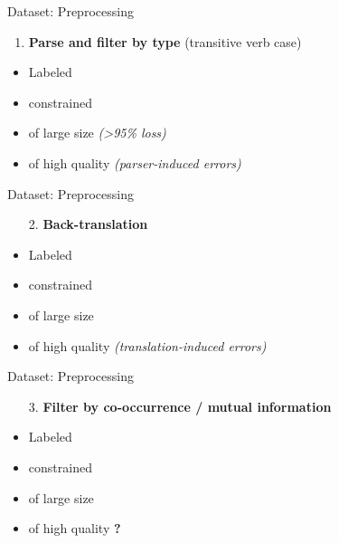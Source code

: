 \documentclass{beamer}
\newcommand{\xmark}{\ding{55}}
\begin{document}
\begin{frame}{Dataset: Preprocessing}

	\begin{enumerate}
	\item \textbf{Parse and filter by type} (transitive verb case)
	\end{enumerate}

	\begin{itemize}
	\item Labeled \textcolor{Yes}{\checkmark}
	\item constrained \textcolor{Yes}{\checkmark}
	\item of large size \textcolor{No}{\xmark} 
	\footnotesize\textit{(>95\% loss)} 
	\normalsize
	\item of high quality \textcolor{No}{\xmark}
	\footnotesize\textit{(parser-induced errors)} 
	\normalsize
	\end{itemize}
\end{frame}

\begin{frame}{Dataset: Preprocessing}

	\begin{enumerate}
	\item[2.] \textbf{Back-translation}
	\end{enumerate}

	\begin{itemize}
	\item Labeled \textcolor{Yes}{\checkmark}
	\item constrained \textcolor{Yes}{\checkmark}
	\item of large size \textcolor{Yes}{\checkmark}
	\item of high quality \textcolor{No}{\xmark}
	\footnotesize\textit{(translation-induced errors)}
	\normalsize
	\end{itemize}
\end{frame}

\begin{frame}{Dataset: Preprocessing}

	\begin{enumerate}
	\item[3.] \textbf{Filter by co-occurrence / mutual information}
	\end{enumerate}

	\begin{itemize}
	\item Labeled \textcolor{Yes}{\checkmark}
	\item constrained \textcolor{Yes}{\checkmark}
	\item of large size \textcolor{Yes}{\checkmark}
	\item of high quality \textcolor{Maybe}{\textbf{?}}
	\end{itemize}
\end{frame}
    
\end{document}
